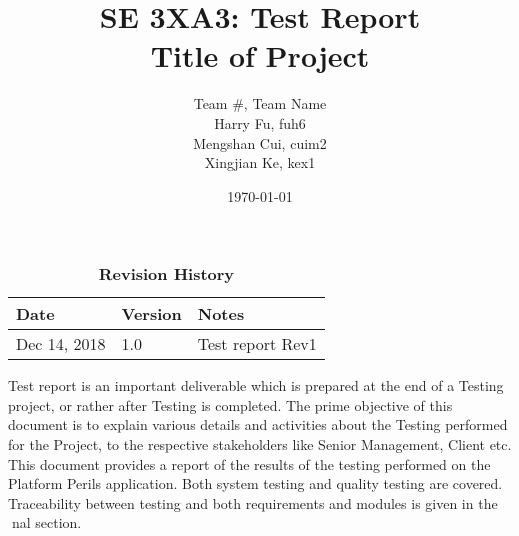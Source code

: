 \documentclass[12pt, titlepage]{article}
\title{SE 3XA3: Test Report\\Title of Project}
\author{Team \#, Team Name
		\\ Harry Fu, fuh6
		\\ Mengshan Cui, cuim2
		\\ Xingjian Ke, kex1
}
\date{\today}
\begin{document}
\maketitle

\tableofcontents
\listoftables
\listoffigures

\begin{table}[bp]
\caption{\bf Revision History}
\begin{tabularx}{\textwidth}{p{3cm}p{2cm}X}
\toprule {\bf Date} & {\bf Version} & {\bf Notes}\\
\midrule
Dec 14, 2018 & 1.0 & Test report Rev1\\
\bottomrule
\end{tabularx}
\end{table}

\newpage


Test report is an important deliverable which is prepared at the end of a Testing project, or rather after Testing is completed. The prime objective of this document is to explain various details and activities about the Testing performed for the Project, to the respective stakeholders like Senior Management, Client etc.
This document provides a report of the results of the testing performed on the Platform Perils application. Both system testing and quality testing are covered. Traceability between testing and both requirements and modules is given in the nal section.
\end{document}
